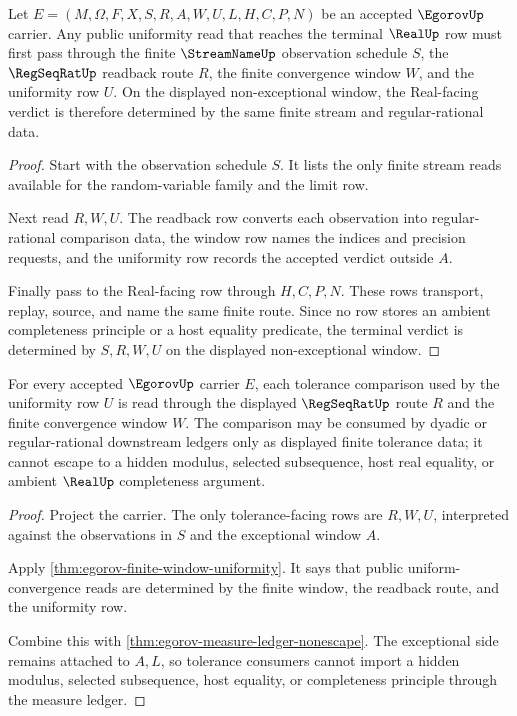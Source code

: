 \begin{theorem}\label{thm:egorov-streamname-real-uniform-window-handoff}
Let $E=(M,\Omega,F,X,S,R,A,W,U,L,H,C,P,N)$ be an accepted $\EgorovUp$ carrier. Any public uniformity read that reaches the terminal $\RealUp$ row must first pass through the finite $\StreamNameUp$ observation schedule $S$, the $\RegSeqRatUp$ readback route $R$, the finite convergence window $W$, and the uniformity row $U$. On the displayed non-exceptional window, the Real-facing verdict is therefore determined by the same finite stream and regular-rational data.
\end{theorem}
\begin{proof}
Start with the observation schedule $S$. It lists the only finite stream reads available for the random-variable family and the limit row.

Next read $R,W,U$. The readback row converts each observation into regular-rational comparison data, the window row names the indices and precision requests, and the uniformity row records the accepted verdict outside $A$.

Finally pass to the Real-facing row through $H,C,P,N$. These rows transport, replay, source, and name the same finite route. Since no row stores an ambient completeness principle or a host equality predicate, the terminal verdict is determined by $S,R,W,U$ on the displayed non-exceptional window.
\end{proof}

\begin{theorem}\label{thm:egorov-regseqrat-dyadic-tolerance-nonescape}
For every accepted $\EgorovUp$ carrier $E$, each tolerance comparison used by the uniformity row $U$ is read through the displayed $\RegSeqRatUp$ route $R$ and the finite convergence window $W$. The comparison may be consumed by dyadic or regular-rational downstream ledgers only as displayed finite tolerance data; it cannot escape to a hidden modulus, selected subsequence, host real equality, or ambient $\RealUp$ completeness argument.
\end{theorem}
\begin{proof}
Project the carrier. The only tolerance-facing rows are $R,W,U$, interpreted against the observations in $S$ and the exceptional window $A$.

Apply \autoref{thm:egorov-finite-window-uniformity}. It says that public uniform-convergence reads are determined by the finite window, the readback route, and the uniformity row.

Combine this with \autoref{thm:egorov-measure-ledger-nonescape}. The exceptional side remains attached to $A,L$, so tolerance consumers cannot import a hidden modulus, selected subsequence, host equality, or completeness principle through the measure ledger.
\end{proof}


